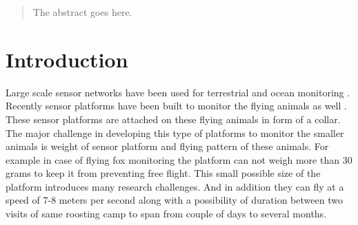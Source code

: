 \documentclass[conference]{IEEEtran}
\begin{document}




\maketitle


\begin{abstract}
The abstract goes here.
\end{abstract}





%
\IEEEpeerreviewmaketitle
\section{Introduction}\label{sec:intro}

Large scale sensor networks have been used for terrestrial \cite{robo-mote} and ocean 
monitoring \cite{Vasilescu05krill:an}. Recently sensor platforms have been built to monitor 
the flying animals as well \cite{Anthony:2012:STC:2185677.2185747} \cite{raja-ipsn}. These 
sensor platforms are attached on these flying animals in form of a collar. The major challenge 
in developing this type of platforms to monitor the smaller animals is weight of sensor 
platform and flying pattern of these animals. For example in case of flying fox monitoring 
the platform can not weigh more than 30 grams to keep it from preventing free flight. This 
small possible size of the platform introduces many research challenges\cite{raja-ipsn}. And 
in addition they can fly at a speed of 7-8 meters per second along with a possibility of 
duration between two visits of same roosting camp to span from couple of days to several months.\
\end{document}
